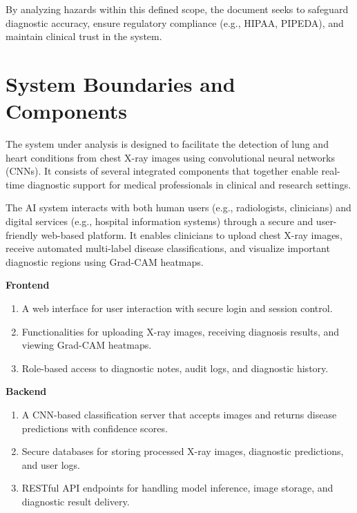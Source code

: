 \documentclass{article}
\begin{document}
By analyzing hazards within this defined scope, the document seeks to safeguard diagnostic accuracy, ensure regulatory compliance (e.g., HIPAA, PIPEDA), and maintain clinical trust in the system.


\section{System Boundaries and Components}


The system under analysis is designed to facilitate the detection of lung and heart conditions from chest X-ray images using convolutional neural networks (CNNs). It consists of several integrated components that together enable real-time diagnostic support for medical professionals in clinical and research settings.

The AI system interacts with both human users (e.g., radiologists, clinicians) and digital services (e.g., hospital information systems) through a secure and user-friendly web-based platform. It enables clinicians to upload chest X-ray images, receive automated multi-label disease classifications, and visualize important diagnostic regions using Grad-CAM heatmaps.

\textbf{Frontend}
\begin{enumerate}
  \item A web interface for user interaction with secure login and session control.
  \item Functionalities for uploading X-ray images, receiving diagnosis results, and viewing Grad-CAM heatmaps.
  \item Role-based access to diagnostic notes, audit logs, and diagnostic history.
\end{enumerate}

\textbf{Backend}
\begin{enumerate}
  \item A CNN-based classification server that accepts images and returns disease predictions with confidence scores.
  \item Secure databases for storing processed X-ray images, diagnostic predictions, and user logs.
  \item RESTful API endpoints for handling model inference, image storage, and diagnostic result delivery.
\end{enumerate}
\end{document}
